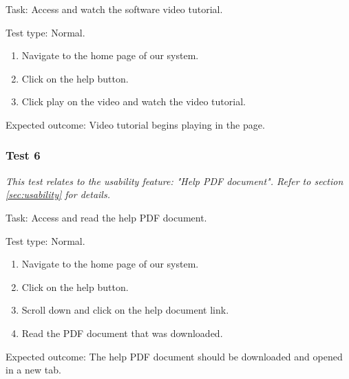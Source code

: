 {\sffamily Task:} Access and watch the software video tutorial.\\

{\color{gray} \hrulefill}

{\sffamily Test type: Normal.}\\

\begin{enumerate}
  \item Navigate to the home page of our system.
  \item Click on the help button.
  \item Click play on the video and watch the video tutorial.
\end{enumerate}

{\sffamily Expected outcome:} Video tutorial begins playing in
the page.

{\color{gray} \hrulefill}

\vspace{0.2cm}

\subsubsection{Test 6}

\textit{This test relates to the usability feature:
"Help PDF document". Refer to section
\ref{sec:usability} for details.} \\ \vspace{0.2cm}

{\sffamily Task:} Access and read the help PDF document.\\

{\color{gray} \hrulefill}

{\sffamily Test type: Normal.}\\

\begin{enumerate}
  \item Navigate to the home page of our system.
  \item Click on the help button.
  \item Scroll down and click on the help document link.
  \item Read the PDF document that was downloaded.
\end{enumerate}

{\sffamily Expected outcome:} The help PDF document should
be downloaded and opened in a new tab. \\

{\color{gray} \hrulefill}

\vspace{0.2cm}


